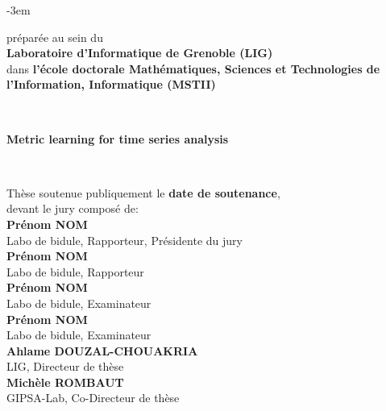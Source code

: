 \begin{titlepage}
\begin{adjustwidth}{}{-3em}
\begin{flushleft}
\vfill

\begin{flushright}
\begin{minipage}{\leftshift}
\begin{flushleft}
{préparée au sein du \\\textbf{Laboratoire d'Informatique de Grenoble (LIG)}\\
dans \textbf{l'école doctorale Mathématiques, Sciences et Technologies de l'Information, Informatique (MSTII)}}
\end{flushleft}
\end{minipage}
\end{flushright}~~\\[1cm]

\vfill

\begin{flushright}
\begin{minipage}{\leftshift}
\begin{flushleft}
{ \Huge \bfseries Metric learning for time series analysis}
\end{flushleft}
\end{minipage}
\end{flushright}~~\\[1cm]

\vfill

\begin{flushright}
\begin{minipage}{\leftshift}
\begin{flushleft}
{Thèse soutenue publiquement le \textbf{date de soutenance},\\ devant le jury composé de:}\\[\espvert]
{\textbf{Prénom NOM}}\\
{Labo de bidule, Rapporteur, Présidente du jury}\\
{\textbf{Prénom NOM}}\\
{Labo de bidule, Rapporteur}\\
{\textbf{Prénom NOM}}\\
{Labo de bidule, Examinateur}\\
{\textbf{Prénom NOM}}\\
{Labo de bidule, Examinateur}\\
{\textbf{Ahlame DOUZAL-CHOUAKRIA}}\\
{LIG, Directeur de thèse}\\
{\textbf{Michèle ROMBAUT}}\\
{GIPSA-Lab, Co-Directeur de thèse}\\
\end{flushleft}
\end{minipage}
\end{flushright}
\vfill
\end{flushleft}
\end{adjustwidth}
\end{titlepage}
\setlength{\parskip}{10pt}
\endgroup

